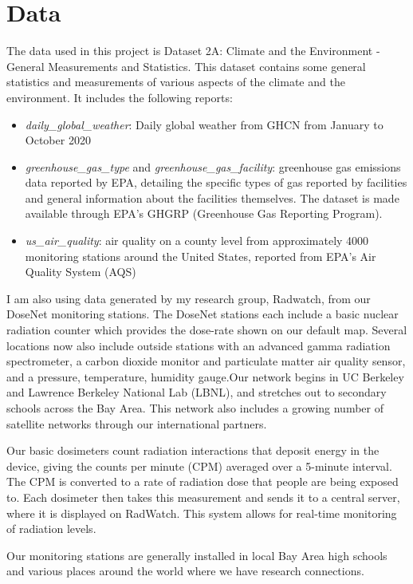 \section{Data}
The data used in this project is Dataset 2A: Climate and the Environment - General Measurements and Statistics. This dataset contains some general statistics and measurements of various aspects of the climate and the environment. It includes the following reports:
\begin{itemize}
    \item \textit{daily\_global\_weather}: Daily global weather from GHCN from January to October 2020
    \item \textit{greenhouse\_gas\_type} and \textit{greenhouse\_gas\_facility}: greenhouse gas emissions data reported by EPA, detailing the specific types of gas reported by facilities and general information about the facilities themselves. The dataset is made available through EPA’s GHGRP (Greenhouse Gas Reporting Program).
    \item \textit{us\_air\_quality}: air quality on a county level from approximately 4000 monitoring stations around the United States, reported from EPA’s Air Quality System (AQS)
\end{itemize}

I am also using data generated by my research group, Radwatch, from our DoseNet monitoring stations. The DoseNet stations each include a basic nuclear radiation counter which provides the dose-rate shown on our default map. Several locations now also include outside stations with an advanced gamma radiation spectrometer, a carbon dioxide monitor and particulate matter air quality sensor, and a pressure, temperature, humidity gauge.Our network begins in UC Berkeley and Lawrence Berkeley National Lab (LBNL), and stretches out to secondary schools across the Bay Area. This network also includes a growing number of satellite networks through our international partners.

Our basic dosimeters count radiation interactions that deposit energy in the device, giving the counts per minute (CPM) averaged over a 5-minute interval. The CPM is converted to a rate of radiation dose that people are being exposed to. Each dosimeter then takes this measurement and sends it to a central server, where it is displayed on RadWatch. This system allows for real-time monitoring of radiation levels.

Our monitoring stations are generally installed in local Bay Area high schools and various places around the world where we have research connections. 